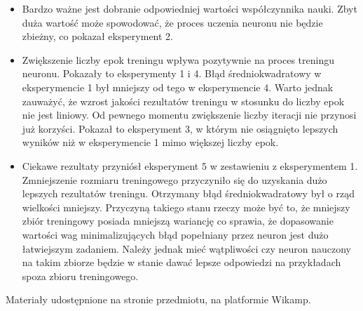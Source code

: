 \documentclass[12pt]{article}
\begin{document}
\begin{itemize}
\item Bardzo ważne jest dobranie odpowiedniej wartości współczynnika nauki. Zbyt duża wartość może spowodować, że proces uczenia neuronu nie będzie zbieżny, co pokazał eksperyment 2.
\item Zwiększenie liczby epok treningu wpływa pozytywnie na proces treningu neuronu. Pokazały to eksperymenty 1 i 4. Błąd średniokwadratowy w eksperymencie 1 był mniejszy od tego w eksperymencie 4. Warto jednak zauważyć, że wzrost jakości rezultatów treningu w stosunku do liczby epok nie jest liniowy. Od pewnego momentu zwiększenie liczby iteracji nie przynosi już korzyści. Pokazał to eksperyment 3, w którym nie osiągnięto lepszych wyników niż w eksperymencie 1 mimo większej liczby epok.
\item Ciekawe rezultaty przyniósł eksperyment 5 w zestawieniu z eksperymentem 1. Zmniejszenie rozmiaru treningowego przyczyniło się do uzyskania dużo lepszych rezultatów treningu. Otrzymany błąd średniokwadratowy był o rząd wielkości mniejszy. Przyczyną takiego stanu rzeczy może być to, że mniejszy zbiór treningowy posiada mniejszą wariancję co sprawia, że dopasowanie wartości wag minimalizujących błąd popełniany przez neuron jest dużo łatwiejszym zadaniem. Należy jednak mieć wątpliwości czy neuron nauczony na takim zbiorze będzie w stanie dawać lepsze odpowiedzi na przykładach spoza zbioru treningowego. 
\end{itemize}

\begin{thebibliography}{0}

 Materiały udostępnione na stronie przedmiotu, na platformie Wikamp.

\end{thebibliography}
\end{document}
